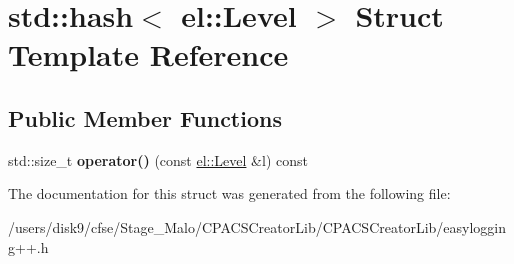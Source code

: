 \hypertarget{structstd_1_1hash_3_01el_1_1Level_01_4}{\section{std\-:\-:hash$<$ el\-:\-:Level $>$ Struct Template Reference}
\label{structstd_1_1hash_3_01el_1_1Level_01_4}
}
\subsection*{Public Member Functions}
\begin{DoxyCompactItemize}
\item 
\hypertarget{structstd_1_1hash_3_01el_1_1Level_01_4_a534496ed916cbc46814822bc0dc1e210}{std\-::size\-\_\-t {\bfseries operator()} (const \hyperlink{namespaceel_ab0ac6091262344c52dd2d3ad099e8e36}{el\-::\-Level} \&l) const }\label{structstd_1_1hash_3_01el_1_1Level_01_4_a534496ed916cbc46814822bc0dc1e210}

\end{DoxyCompactItemize}


The documentation for this struct was generated from the following file\-:\begin{DoxyCompactItemize}
\item 
/users/disk9/cfse/\-Stage\-\_\-\-Malo/\-C\-P\-A\-C\-S\-Creator\-Lib/\-C\-P\-A\-C\-S\-Creator\-Lib/easylogging++.\-h\end{DoxyCompactItemize}
